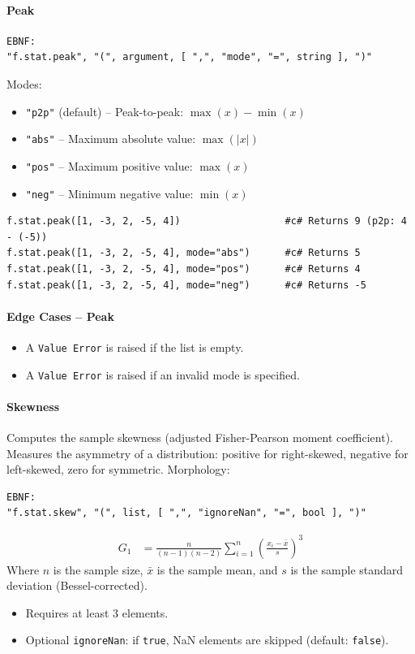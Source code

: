 \paragraph{Peak}
\begin{verbatim}
EBNF:
"f.stat.peak", "(", argument, [ ",", "mode", "=", string ], ")"
\end{verbatim}
Modes:
\begin{itemize}
\item \texttt{"p2p"} (default) -- Peak-to-peak: $\max(x) - \min(x)$
\item \texttt{"abs"} -- Maximum absolute value: $\max(|x|)$
\item \texttt{"pos"} -- Maximum positive value: $\max(x)$
\item \texttt{"neg"} -- Minimum negative value: $\min(x)$
\end{itemize}
\begin{verbatim}
f.stat.peak([1, -3, 2, -5, 4])                  #c# Returns 9 (p2p: 4 - (-5))
f.stat.peak([1, -3, 2, -5, 4], mode="abs")      #c# Returns 5
f.stat.peak([1, -3, 2, -5, 4], mode="pos")      #c# Returns 4
f.stat.peak([1, -3, 2, -5, 4], mode="neg")      #c# Returns -5
\end{verbatim}

\paragraph{Edge Cases -- Peak}
\begin{itemize}
\item A \texttt{Value Error} is raised if the list is empty.
\item A \texttt{Value Error} is raised if an invalid mode is specified.
\end{itemize}

\paragraph{Skewness}
Computes the sample skewness (adjusted Fisher-Pearson moment coefficient). Measures the asymmetry of a distribution: positive for right-skewed, negative for left-skewed, zero for symmetric.
Morphology:
\begin{verbatim}
EBNF:
"f.stat.skew", "(", list, [ ",", "ignoreNan", "=", bool ], ")"
\end{verbatim}
\begin{align*}
G_1 &= \frac{n}{(n-1)(n-2)} \sum_{i=1}^{n} \left( \frac{x_i - \bar{x}}{s} \right)^3
\end{align*}
Where $n$ is the sample size, $\bar{x}$ is the sample mean, and $s$ is the sample standard deviation (Bessel-corrected).
\begin{itemize}
\item Requires at least 3 elements.
\item Optional \texttt{ignoreNan}: if \texttt{true}, NaN elements are skipped (default: \texttt{false}).
\end{itemize}


